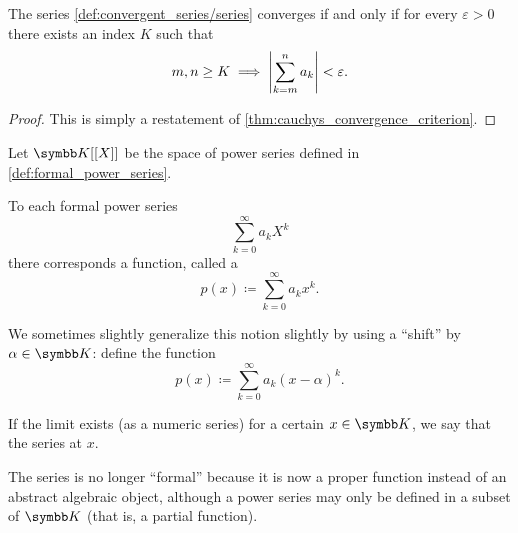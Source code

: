 \begin{proposition}\label{thm:cauchy_series_convergence_criterion}\cite[3.22]{Rudin1991}
  The series \cref{def:convergent_series/series} converges if and only if for every \( \varepsilon > 0 \) there exists an index \( K \) such that
  \begin{equation*}
    m, n \geq K \implies \left\vert \sum_{k=m}^n a_k \right\vert < \varepsilon.
  \end{equation*}
\end{proposition}
\begin{proof}
  This is simply a restatement of \cref{thm:cauchys_convergence_criterion}.
\end{proof}

\begin{definition}\label{def:convergent_power_series}
  Let \( \K[[X]] \) be the space of power series defined in \cref{def:formal_power_series}.

  To each formal power series
  \begin{equation*}
    \sum_{k=0}^\infty a_k X^k
  \end{equation*}
  there corresponds a function, called a 
  \begin{equation}\label{def:convergent_power_series/series}
    p(x) \coloneqq \sum_{k=0}^\infty a_k x^k.
  \end{equation}

  We sometimes slightly generalize this notion slightly by using a \enquote{shift} by \( \alpha \in \K \): define the function
  \begin{equation}\label{def:convergent_power_series/shifted_series}
    p(x) \coloneqq \sum_{k=0}^\infty a_k (x - \alpha)^k.
  \end{equation}

  If the limit exists (as a numeric series) for a certain \( x \in \K \), we say that the series  at \( x \).

  The series is no longer \enquote{formal} because it is now a proper function instead of an abstract algebraic object, although a power series may only be defined in a subset of \( \K \) (that is, a partial function).
\end{definition}

